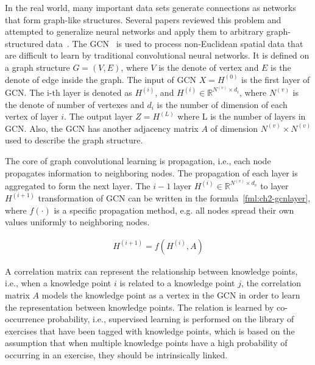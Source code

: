 In the real world, many important data sets generate connections as networks that form graph-like structures. Several papers reviewed this problem and attempted to generalize neural networks and apply them to arbitrary graph-structured data~\cite{wu2018socialgcn, dettmers2018convolutional}. The GCN~\cite{kipf2016semi} is used to process non-Euclidean spatial data that are difficult to learn by traditional convolutional neural networks. It is defined on a graph structure \(G=(V, E)\), where \(V\) is the denote of vertex and \(E\) is the denote of edge inside the graph. The input of GCN \(X = H^{(0)}\) is the first layer of GCN. The i-th layer is denoted as \(H^{(i)}\), and \(H^{(i)}\in \mathbb{R}^{N^{(v)}\times d_{i}}\), where \(N^{(v)}\) is the denote of number of vertexes and \(d_{i}\) is the number of dimension of each vertex of layer \(i\). The output layer \(Z = H^{(L)}\) where L is the number of layers in GCN\@. Also, the GCN has another adjacency matrix \(A\) of dimension \(N^{(v)}\times N^{(v)}\) used to describe the graph structure.

The core of graph convolutional learning is propagation, i.e., each node propagates information to neighboring nodes. The propagation of each layer is aggregated to form the next layer. The \(i-1\) layer \(H^{(i)}\in \mathbb{R}^{N^{(v)}\times d_v}\) to layer \(H^{(i+1)}\) transformation of GCN can be written in the formula~\ref{fml:ch2-gcnlayer}, where \(f(\cdot)\) is a specific propagation method, e.g. all nodes spread their own values uniformly to neighboring nodes.

\begin{align}
	H^{(i+1)}=f(H^{(i)},A) \label{fml:ch2-gcnlayer}
\end{align}


A correlation matrix can represent the relationship between knowledge points, i.e., when a knowledge point \(i\) is related to a knowledge point \(j\), the correlation matrix \(A\) models the knowledge point as a vertex in the GCN in order to learn the representation between knowledge points. The relation is learned by co-occurrence probability, i.e., supervised learning is performed on the library of exercises that have been tagged with knowledge points, which is based on the assumption that when multiple knowledge points have a high probability of occurring in an exercise, they should be intrinsically linked.

